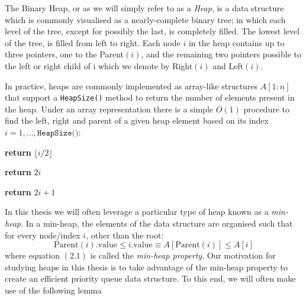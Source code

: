 The Binary Heap, or as we will simply refer to as a \textit{Heap}, is a data structure which is commonly visualised as a nearly-complete binary tree; in which each level of the tree, except for possibly the last, is completely filled. The lowest level of the tree, is filled from left to right. Each node $i$ in the heap contains up to three pointers, one to the Parent$(i)$, and the remaining two pointers possible to the left or right child of i which we denote by Right$(i)$ and Left$(i)$.

In practice, heaps are commonly implemented as array-like structures $A[1:n]$ that support a \texttt{HeapSize()} method to return the number of elements present in the heap. Under an array representation there is a simple $O(1)$ procedure to find the left, right and parent of a given heap element based on its index $i = 1,\dots,\texttt{HeapSize()}$: 
\begin{algorithm}
\begin{algorithmic}[1]
\State \textbf{return} $\lfloor i/2\rfloor$
\EndProcedure
\end{algorithmic}
\end{algorithm}


\begin{algorithm}
\begin{algorithmic}[1]
\State \textbf{return} $2i$
\EndProcedure
\end{algorithmic}
\end{algorithm}

\begin{algorithm}
\begin{algorithmic}[1]
\State \textbf{return} $2i+1$
\EndProcedure
\end{algorithmic}
\end{algorithm}

In this thesis we will often leverage a particular type of heap known as a \textit{min-heap}. In a min-heap, the elements of the data structure are organised such that for every node/index $i$, other than the root:
\begin{equation}
    \text{Parent}(i).\text{value} \leq i.\text{value} \equiv A[\text{Parent}(i)] \leq A[i]
\end{equation}
where equation $(2.1)$ is called the \textit{min-heap property}. Our motivation for studying heaps in this thesis is to take advantage of the min-heap property to create an efficient priority queue data structure. To this end, we will often make use of the following lemma

